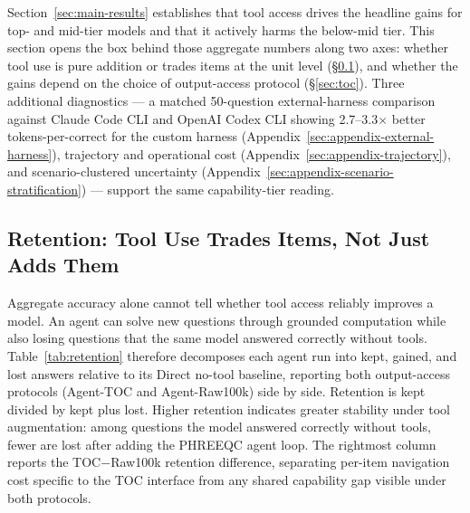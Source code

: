 \documentclass{article}
\begin{document}
Section~\ref{sec:main-results} establishes that tool access drives the headline gains for top- and mid-tier models and that it actively harms the below-mid tier. This section opens the box behind those aggregate numbers along two axes: whether tool use is pure addition or trades items at the unit level (§\ref{sec:diag-retention}), and whether the gains depend on the choice of output-access protocol (§\ref{sec:toc}). Three additional diagnostics --- a matched 50-question external-harness comparison against Claude Code CLI and OpenAI Codex CLI showing 2.7--3.3$\times$ better tokens-per-correct for the custom harness (Appendix~\ref{sec:appendix-external-harness}), trajectory and operational cost (Appendix~\ref{sec:appendix-trajectory}), and scenario-clustered uncertainty (Appendix~\ref{sec:appendix-scenario-stratification}) --- support the same capability-tier reading.

\subsection{Retention: Tool Use Trades Items, Not Just Adds Them}
\label{sec:diag-retention}

Aggregate accuracy alone cannot tell whether tool access reliably improves a model. An agent can solve new questions through grounded computation while also losing questions that the same model answered correctly without tools. Table~\ref{tab:retention} therefore decomposes each agent run into kept, gained, and lost answers relative to its Direct no-tool baseline, reporting both output-access protocols (Agent-TOC and Agent-Raw100k) side by side. Retention is kept divided by kept plus lost. Higher retention indicates greater stability under tool augmentation: among questions the model answered correctly without tools, fewer are lost after adding the PHREEQC agent loop. The rightmost column reports the TOC$-$Raw100k retention difference, separating per-item navigation cost specific to the TOC interface from any shared capability gap visible under both protocols.
\end{document}
